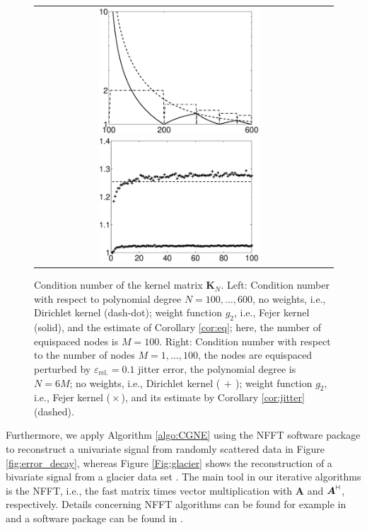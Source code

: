 \documentclass[11pt,a4paper,bibtotoc]{scrartcl}
\newcommand{\zb}[1]{\ensuremath{\boldsymbol{#1}}}
\newcommand{\adj}{{\vdash \hspace*{-1.72mm} \dashv}}
\numberwithin{equation}{section}
\numberwithin{table}{section}
\numberwithin{figure}{section}
\begin{document}
\begin{figure}[ht!]
  \begin{center}
    \begin{tabular}{cc}
      \includegraphics[width=6cm]{images/equidist_example1.eps}
      \includegraphics[width=6cm]{images/test_cond1.eps}
    \end{tabular}
  \end{center}
  \caption{Condition number of the kernel matrix $\zb K_N$.
    Left: Condition number with respect to polynomial degree
    $N=100,\hdots,600$, no weights, i.e., Dirichlet kernel (dash-dot); weight
    function $g_2$, i.e., Fejer kernel (solid), and the estimate of Corollary
    \ref{cor:eq}; here, the number of equispaced nodes is $M=100$.
    Right: Condition number with respect to the number of nodes
    $M=1,\hdots,100$, the nodes are equispaced perturbed by
    $\varepsilon_{\text{rel.}}=0.1$ jitter error, the polynomial degree is 
    $N=6M$;
    no weights, i.e., Dirichlet kernel ($\,+\,$);
    weight function $g_2$, i.e., Fejer kernel (${}\times{}$), and its estimate
    by Corollary \ref{cor:jitter} (dashed).\label{Fig:cond_eq_jitter}}
\end{figure}

Furthermore, we apply Algorithm \ref{algo:CGNE} using the NFFT software
package \cite{kupo02C} to reconstruct a univariate signal from randomly
scattered data in Figure \ref{fig:error_decay}, whereas Figure
\ref{Fig:glacier} shows the reconstruction of a bivariate signal from a
glacier data set \cite{Franke.Daten}. 
The main tool in our iterative algorithms is the NFFT, i.e., the fast matrix
times vector multiplication with $\zb A$ and $\zb A^{\adj}$, respectively.
Details concerning NFFT algorithms can be found for example in \cite{postta01}
and a software package can be found in \cite{kupo02C}.
\end{document}
